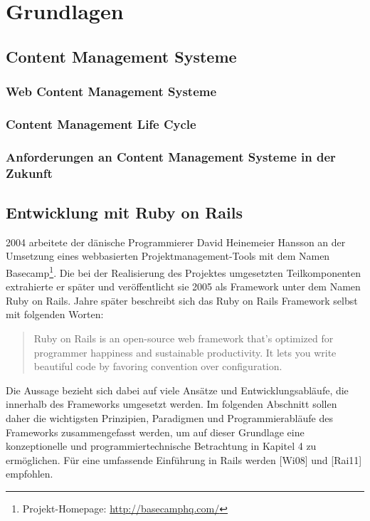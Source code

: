 \chapter{Grundlagen}

\section{Content Management Systeme}
\subsection{Web Content Management Systeme}
\subsection{Content Management Life Cycle}
\subsection{Anforderungen an Content Management Systeme in der Zukunft}


\section{Entwicklung mit Ruby on Rails}

2004 arbeitete der dänische Programmierer David Heinemeier Hansson an der Umsetzung eines webbasierten Projektmanagement-Tools mit dem Namen Basecamp\footnote{Projekt-Homepage: \href{http://basecamphq.com/}{http://basecamphq.com/}}. Die bei der Realisierung des Projektes umgesetzten Teilkomponenten extrahierte er später und veröffentlicht sie 2005 als Framework unter dem Namen Ruby on Rails.
\newline
{} Jahre später beschreibt sich das Ruby on Rails Framework selbst mit folgenden Worten:
\begin{quote}
Ruby on Rails is an open-source web framework that’s
optimized for programmer happiness and sustainable
productivity. It lets you write beautiful code by
favoring convention over configuration.
\end{quote}

Die Aussage bezieht sich dabei auf viele Ansätze und Entwicklungsabläufe, die innerhalb des Frameworks umgesetzt werden.
Im folgenden Abschnitt sollen daher die wichtigsten Prinzipien, Paradigmen und Programmierabläufe des Frameworks zusammengefasst werden, um auf dieser Grundlage eine konzeptionelle und programmiertechnische Betrachtung in Kapitel 4 zu ermöglichen.
\newline
\newline
Für eine umfassende Einführung in Rails werden [Wi08] und [Rai11] empfohlen.

